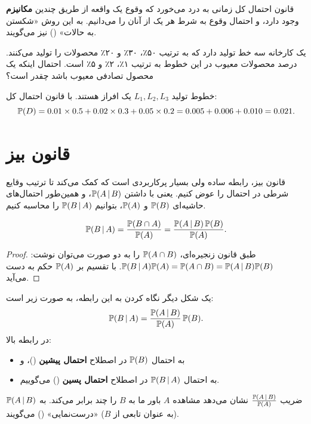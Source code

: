 \begin{note}
\notetitle قانون احتمال کل زمانی به درد می‌خورد که وقوع یک واقعه از طریق چندین \textbf{مکانیزم} وجود دارد، و احتمال وقوع به شرط هر یک از آنان را می‌دانیم. به این روش «شکستن به حالات» () نیز می‌گویند.
\end{note}

\begin{example}
یک کارخانه سه خط تولید دارد که به ترتیب ۵۰٪، ۳۰٪ و ۲۰٪ محصولات را تولید می‌کنند. درصد محصولات معیوب در این خطوط به ترتیب ۱٪، ۲٪ و ۵٪ است. احتمال اینکه یک محصول تصادفی معیوب باشد چقدر است؟
\begin{solution}
خطوط تولید $L_1,L_2,L_3$ یک افراز هستند. با قانون احتمال کل:
\[
\mathbb{P}(D)=0.01\times0.5+0.02\times0.3+0.05\times0.2=0.005+0.006+0.010=0.021 .
\]
\end{solution}
\end{example}

\section{قانون بیز }

قانون بیز، رابطه ساده ولی بسیار پرکاربردی است که کمک می‌کند تا ترتیب وقایع شرطی در احتمال را عوض کنیم. یعنی با داشتن $\mathbb{P}(A\,|\, B)$، و همین‌طور احتمال‌های حاشیه‌ای $\mathbb{P}(B)$ و $\mathbb{P}(A)$، بتوانیم $\mathbb{P}(B\,|\, A)$ را محاسبه کنیم.

\begin{theorem}
\[
\mathbb{P}(B\,|\, A)=\frac{\mathbb{P}(B\cap A)}{\mathbb{P}(A)}=\frac{\mathbb{P}(A\,|\, B)\,\mathbb{P}(B)}{\mathbb{P}(A)} .
\]
\end{theorem}
\begin{proof}
طبق قانون زنجیره‌ای، $\mathbb{P}(A\cap B)$ را به دو صورت می‌توان نوشت:
$\mathbb{P}(B\,|\, A)\mathbb{P}(A)=\mathbb{P}(A\cap B)=\mathbb{P}(A\,|\, B)\mathbb{P}(B)$. با تقسیم بر $\mathbb{P}(A)$ حکم به دست می‌آید.
\end{proof}

یک شکل دیگر نگاه کردن به این رابطه، به صورت زیر است:
\[
\mathbb{P}(B\,|\, A)=\frac{\mathbb{P}(A\,|\, B)}{\mathbb{P}(A)}\,\mathbb{P}(B).
\]
در رابطه بالا:
\begin{itemize}
\item به احتمال $\mathbb{P}(B)$ در اصطلاح \textbf{احتمال پیشین} ()، و
\item به احتمال $\mathbb{P}(B\,|\, A)$ در اصطلاح \textbf{احتمال پسین} () می‌گوییم.
\end{itemize}
ضریب $\frac{\mathbb{P}(A\,|\, B)}{\mathbb{P}(A)}$ نشان می‌دهد مشاهده $A$ باور ما به $B$ را چند برابر می‌کند. به $\mathbb{P}(A\,|\, B)$ (به عنوان تابعی از $B$) «درست‌نمایی» () می‌گویند.

